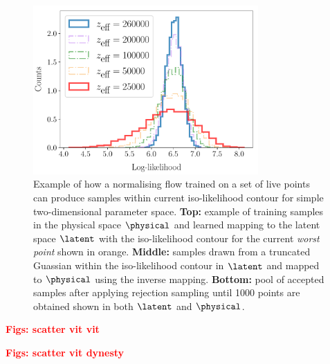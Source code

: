 \documentclass[aps,superscriptaddress,twocolumn,nopreprintnumbers,floatfix,groupedaddress]{revtex4-1}
\newcommand{\figwidth}{8.6cm}
\begin{document}
\begin{figure}
	\centering
	\includegraphics[width=\figwidth]{figs/hists_rect.pdf}
	\caption{Example of how a normalising flow trained on a set of live points can produce samples within current iso-likelihood contour for simple two-dimensional parameter space. \textbf{Top:} example of training samples in the physical space $\physical$ and learned mapping to the latent space $\latent$ with the iso-likelihood contour for the current \textit{worst point} shown in orange. \textbf{Middle:} samples drawn from a truncated Guassian within the iso-likelihood contour in $\latent$ and mapped to $\physical$ using the inverse mapping. \textbf{Bottom:} pool of accepted samples after applying rejection sampling until 1000 points are obtained shown in both $\latent$ and $\physical$.}
	\label{fig:hists}
\end{figure}



\textbf{\textcolor{red}{Figs: scatter vit vit}}

\textbf{\textcolor{red}{Figs: scatter vit dynesty}}
\end{document}
